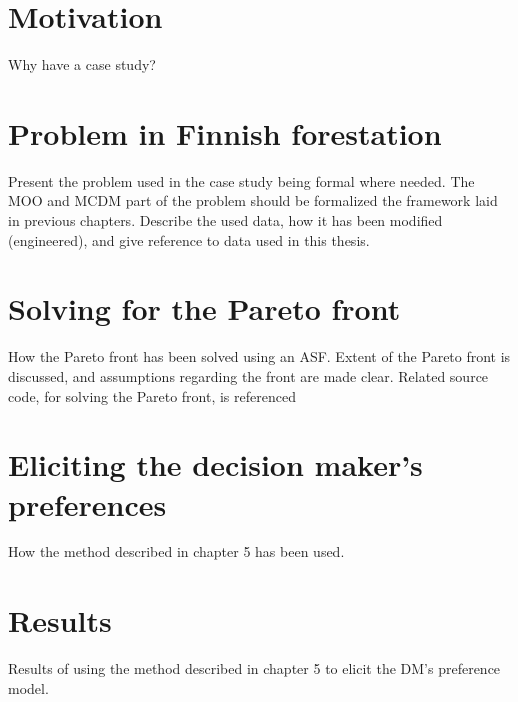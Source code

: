 \section{Motivation}
{\color{red}
Why have a case study?
}

\section{Problem in Finnish forestation}
{\color{red}
Present the problem used in the case study being formal where needed. The MOO and MCDM  part of the problem should be formalized the framework laid in
previous chapters. Describe the used data, how it has been modified (engineered), and give reference to data used in this thesis.
}

\section{Solving for the Pareto front}
{\color{red}
How the Pareto front has been solved using an ASF. Extent of the Pareto front is discussed, and assumptions regarding the front are made clear.
Related source code, for solving the Pareto front, is referenced
}

\section{Eliciting the decision maker's preferences}
{\color{red}
How the method described in chapter 5 has been used.
}

\section{Results}
{\color{red}
Results of using the method described in chapter 5 to elicit the DM's preference model.
}